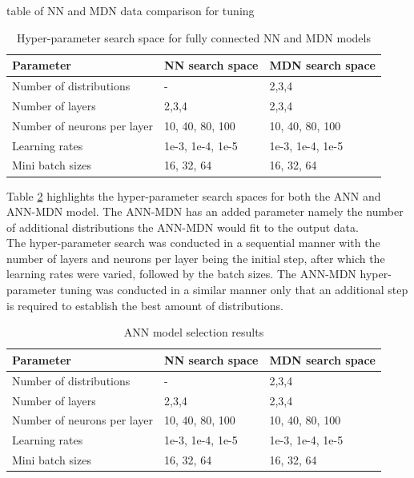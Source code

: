 \documentclass[a4paper,fleqn]{cas-sc}
\begin{document}
table of NN and MDN data comparison for tuning

\clearpage
\begin{table}[h!]
\caption{Hyper-parameter search space for fully connected NN and MDN models}\label{tbl_tuning}
\begin{tabular*}{\tblwidth}{p{}p{}p{}}
\toprule
 Parameter& NN search space & MDN search space \\ %
\midrule
 Number of distributions & - & 2,3,4  \\
 Number of layers & 2,3,4 & 2,3,4\\
 Number of neurons per layer & 10, 40, 80, 100  & 10, 40, 80, 100\\
 Learning rates & 1e-3, 1e-4, 1e-5 &  1e-3, 1e-4, 1e-5   \\
 Mini batch sizes  & 16, 32, 64 & 16, 32, 64  \\
\bottomrule
\end{tabular*}
\end{table}
Table \ref{tbl_tuning} highlights the hyper-parameter search spaces for both the ANN and ANN-MDN model. The ANN-MDN has an added parameter namely the number of additional distributions the ANN-MDN would fit to the output data. \\

The hyper-parameter search was conducted in a sequential manner with the number of layers and neurons per layer being the initial step, after which the learning rates were varied, followed by the batch sizes. The ANN-MDN hyper-parameter tuning was conducted in a similar manner only that an additional step is required to establish the best amount of distributions.

\begin{table}[h!]
\caption{ANN model selection results}\label{tbl_tuning}
\begin{tabular*}{\tblwidth}{p{}p{}p{}}
\toprule
 Parameter& NN search space & MDN search space \\ %
\midrule
 Number of distributions & - & 2,3,4  \\
 Number of layers & 2,3,4 & 2,3,4\\
 Number of neurons per layer & 10, 40, 80, 100  & 10, 40, 80, 100\\
 Learning rates & 1e-3, 1e-4, 1e-5 &  1e-3, 1e-4, 1e-5   \\
 Mini batch sizes  & 16, 32, 64 & 16, 32, 64  \\
\bottomrule
\end{tabular*}
\end{table}
\end{document}
